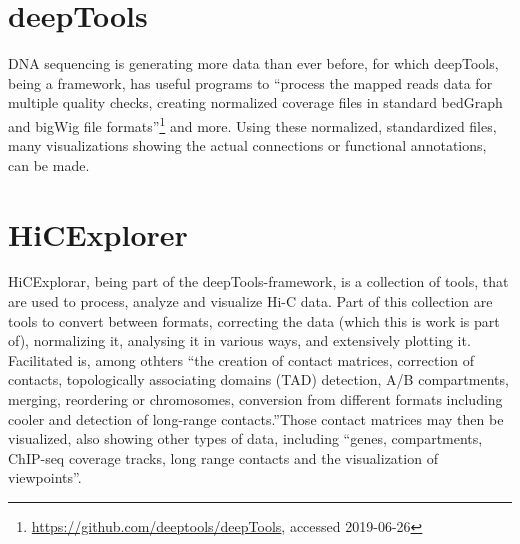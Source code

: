 


\newpage

\section{deepTools}\label{sec:deeptools}


DNA sequencing is generating more data than ever before, for which deepTools,
being a framework, has useful programs to ``process the mapped reads data for
multiple quality checks, creating normalized coverage files in standard
bedGraph and bigWig file
formats''\footnote{\url{https://github.com/deeptools/deepTools}, accessed
2019-06-26} and more. Using these normalized, standardized files, many
visualizations showing the actual connections or functional
annotations, can be made.


\section{HiCExplorer}\label{sec:hicexplorer}


HiCExplorar, being part of the deepTools-framework, is a collection of tools,
that are used to process, analyze and visualize Hi-C data. Part of this
collection are tools to convert between formats, correcting the data (which
this is work is part of), normalizing it, analysing it in various ways, and
extensively plotting it. Facilitated is, among othters ``the creation of
contact matrices, correction of contacts, topologically associating domains
(TAD) detection, A/B compartments, merging, reordering or chromosomes,
conversion from different formats including cooler and detection of long-range
contacts.''\footnotemark Those contact matrices may then be visualized, also
showing other types of data, including ``genes, compartments, ChIP-seq coverage
tracks, long range contacts and the visualization of
viewpoints''\footnotemark[\value{footnote}].




